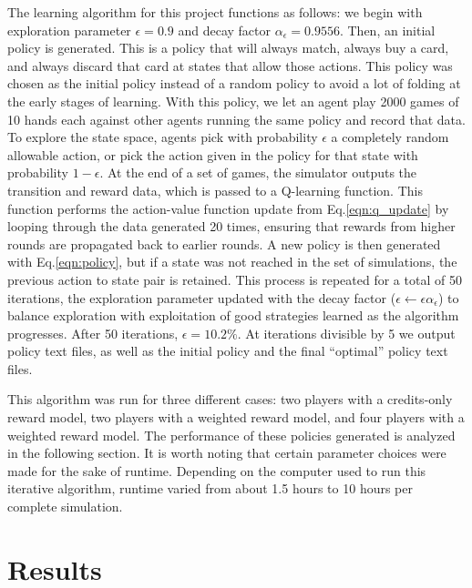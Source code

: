 \documentclass{article}
\begin{document}
The learning algorithm for this project functions as follows: we begin with exploration parameter $\epsilon = 0.9$ and decay factor $\alpha_\epsilon = 0.9556$. Then, an initial policy is generated. This is a policy that will always match, always buy a card, and always discard that card at states that allow those actions. This policy was chosen as the initial policy instead of a random policy to avoid a lot of folding at the early stages of learning. With this policy, we let an agent play 2000 games of 10 hands each against other agents running the same policy and record that data. To explore the state space, agents pick with probability $\epsilon$ a completely random allowable action, or pick the action given in the policy for that state with probability $1-\epsilon$. At the end of a set of games, the simulator outputs the transition and reward data, which is passed to a Q-learning function. This function performs the action-value function update from Eq.\ref{eqn:q_update} by looping through the data generated 20 times, ensuring that rewards from higher rounds are propagated back to earlier rounds. A new policy is then generated with Eq.\ref{eqn:policy}, but if a state was not reached in the set of simulations, the previous action to state pair is retained. This process is repeated for a total of 50 iterations, the exploration parameter updated with the decay factor ($\epsilon \leftarrow \epsilon\alpha_\epsilon$) to balance exploration with exploitation of good strategies learned as the algorithm progresses. After 50 iterations, $\epsilon = 10.2\%$. At iterations divisible by 5 we output policy text files, as well as the initial policy and the final ``optimal'' policy text files. 

This algorithm was run for three different cases: two players with a credits-only reward model, two players with a weighted reward model, and four players with a weighted reward model. The performance of these policies generated is analyzed in the following section. It is worth noting that certain parameter choices were made for the sake of runtime. Depending on the computer used to run this iterative algorithm, runtime varied from about 1.5 hours to 10 hours per complete simulation.

\section{Results} %
\end{document}
